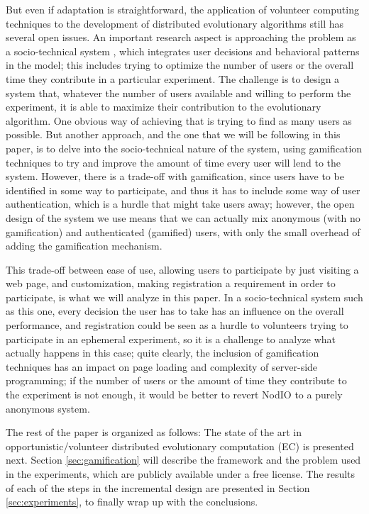 \documentclass{llncs}
\begin{document}
But even if adaptation is straightforward, the application of volunteer
computing techniques to the development of distributed evolutionary algorithms 
still has several open issues. An important research aspect is 
approaching the problem as a socio-technical system
\cite{vespignani2009predicting,merelo2015designing}, which integrates
user decisions and behavioral patterns in the model; this
includes trying to optimize the number of users or the overall time
they contribute in a particular
experiment. The challenge is to design a system that, whatever the
number of users available and willing to perform the experiment, it is able to
maximize their contribution to the evolutionary algorithm. One obvious
way of achieving that is trying to find as many users as possible. But
another approach, and the one that we will be following in this paper, is
to delve into the socio-technical nature of the system, using
gamification techniques to try and improve the amount of time every user will
lend to the system. However, there is a trade-off with gamification,
since users have to be identified in some way to participate, and thus
it has to include some way of user authentication,
which is a hurdle that might take users away; however, the open design
of the system we use means that we can actually mix anonymous (with no
gamification) and authenticated (gamified) users, with only the small overhead
of adding the gamification mechanism.

This trade-off between ease of use, allowing users to
participate by just visiting a web page, and customization, making
registration a requirement in order to %
participate, is what we will analyze in this paper. In a socio-technical system such as this one, every
decision the user has to take has an influence on the overall
performance, and registration could be seen as a hurdle to volunteers
trying to participate in an ephemeral experiment, so it is a challenge
to analyze what actually happens in this case; quite clearly, the
inclusion of gamification techniques has an impact on page loading and
complexity of server-side programming; if the number of users
or the amount of time they contribute to the experiment is not enough,
it would be better to revert NodIO to a purely anonymous system.

The rest of the paper is organized as follows: The state of the art in opportunistic/volunteer distributed evolutionary
computation (EC) is presented next. Section \ref{sec:gamification} will describe the
framework and the problem used in the experiments, which are publicly
available under a free license. The results of each of the steps in the incremental design are presented in Section
\ref{sec:experiments}, to finally wrap up with the conclusions.
\end{document}
